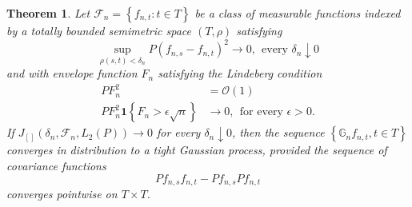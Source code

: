 \documentclass{article}
\newcommand{\set}[1]{\left\{#1\right\}}
\newcommand{\F}{\mathcal{F}}
\newcommand{\Gbb}{\mathbb{G}}
\newcommand{\1}{\mathbf{1}}
\theoremstyle{alden}
\theoremstyle{aldenthm}
\newtheorem{theorem}{Theorem}
\theoremstyle{remark}
\begin{document}
\begin{theorem}
	\label{thm: donsker_changing_classes}
	Let $\F_n = \set{f_{n,t}: t \in T}$ be a class of measurable functions indexed by a totally bounded semimetric space $(T,\rho)$ satisfying
	\begin{equation*}
	\sup_{\rho(s,t) < \delta_n} P (f_{n,s} - f_{n,t})^2 \to 0, ~~ \text{every $\delta_n \downarrow 0$}
	\end{equation*}
	and with envelope function $F_n$ satisfying the Lindeberg condition
	\begin{align*}
	PF_n^2 & = \mathcal{O}(1) \\
	PF_n^2 \1 \set{F_n > \epsilon \sqrt{n}} & \to 0, ~~ \textrm{for every $\epsilon > 0$.}
	\end{align*}
	If $J_{[]}(\delta_n, \F_n, L_2(P)) \to 0$ for every $\delta_n \downarrow 0$, then the sequence $\set{\Gbb_n f_{n,t}, t \in T}$ converges in distribution to a tight Gaussian process, provided the sequence of covariance functions
	\begin{equation*}
	P f_{n,s} f_{n,t} - P f_{n,s} P f_{n,t} 
	\end{equation*}
	converges pointwise on $T \times T$. 
\end{theorem}
\end{document}
